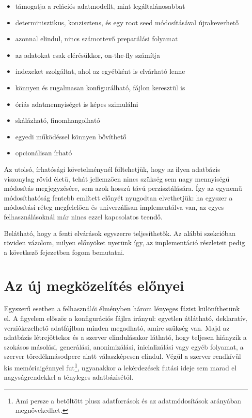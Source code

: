 \documentclass[
    parspace,
    noindent,
    nohyp,
]{elteiktdk}[2023/04/10]
\begin{document}
\begin{itemize}
    \item támogatja a relációs adatmodellt, mint legáltalánosabbat
    \item determinisztikus, konzisztens, és egy root seed módosításával újrakeverhető
    \item azonnal elindul, nincs számottevő preparálási folyamat
    \item az adatokat csak elérésükkor, on-the-fly számítja
    \item indexeket szolgáltat, ahol az egyébként is elvárható lenne
    \item könnyen és rugalmasan konfigurálható, fájlon keresztül is
    \item óriás adatmennyiséget is képes szimulálni
    \item skálázható, finomhangolható
    \item egyedi működéssel könnyen bővíthető
    \item opcionálisan írható
\end{itemize}

Az utolsó, írhatósági követelménynél föltehetjük, hogy az ilyen adatbázis viszonylag rövid életű,
tehát jellemzően nincs szükség sem nagy mennyiségű módosítás megjegyzésére,
sem azok hosszú távú perzisztálására.
Így az egynemű módosíthatóság fentebb említett előnyét nyugodtan elvethetjük:
ha egyszer a módosítási réteg megfelelően és univerzálisan implementálva van,
az egyes felhasználásoknál már nincs ezzel kapcsolatos teendő.

Belátható, hogy a fenti elvárások egyszerre teljesíthetők.
Az alábbi szekcióban röviden vázolom, milyen előnyöket nyerünk így,
az implementáció részleteit pedig a következő fejezetben fogom bemutatni.

\section{Az új megközelítés előnyei}

Egyszerű esetben a felhasználói élményben három lényeges fázist különíthetünk el.
A figyelem először a konfigurációs fájlra irányul:
egyetlen átlátható, deklaratív, verziókezelhető adatfájlban minden megadható, amire szükség van.
Majd az adatbázis létrejöttekor és a szerver elindulásakor látható,
hogy teljesen hiányzik a szokásos másolási, generálási, anonimizálási, inicializálási vagy egyéb folyamat,
a szerver töredékmásodperc alatt válaszképesen elindul.
Végül a szerver rendkívül kis memóriaigénnyel fut\footnote{
    Ami persze a betöltött plusz adatforrások és az adatmódosítások arányában megnövekedhet.
},
ugyanakkor a lekérdezések futási ideje sem marad el nagyságrendekkel a tényleges adatbázisétól.
\end{document}
